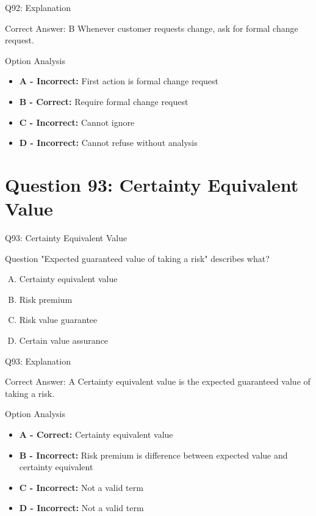 \documentclass{beamer}
\begin{document}
	\begin{frame}{Q92: Explanation}
		\begin{block}{Correct Answer: B}
			Whenever customer requests change, ask for formal change request.
		\end{block}
		\begin{block}{Option Analysis}
			\begin{itemize}
				\item \textbf{A - Incorrect:} First action is formal change request
				\item \textbf{B - Correct:} Require formal change request
				\item \textbf{C - Incorrect:} Cannot ignore
				\item \textbf{D - Incorrect:} Cannot refuse without analysis
			\end{itemize}
		\end{block}
	\end{frame}
	
	\section{Question 93: Certainty Equivalent Value}
	
	\begin{frame}{Q93: Certainty Equivalent Value}
		\begin{block}{Question}
			"Expected guaranteed value of taking a risk" describes what?
		\end{block}
		\begin{enumerate}[(A)]
			\item Certainty equivalent value
			\item Risk premium
			\item Risk value guarantee
			\item Certain value assurance
		\end{enumerate}
	\end{frame}
	
	\begin{frame}{Q93: Explanation}
		\begin{block}{Correct Answer: A}
			Certainty equivalent value is the expected guaranteed value of taking a risk.
		\end{block}
		\begin{block}{Option Analysis}
			\begin{itemize}
				\item \textbf{A - Correct:} Certainty equivalent value
				\item \textbf{B - Incorrect:} Risk premium is difference between expected value and certainty equivalent
				\item \textbf{C - Incorrect:} Not a valid term
				\item \textbf{D - Incorrect:} Not a valid term
			\end{itemize}
		\end{block}
	\end{frame}
	
\end{document}
